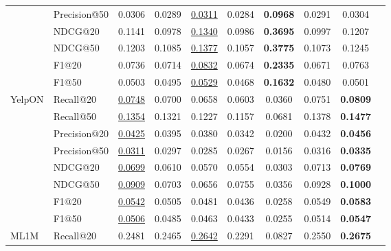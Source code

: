 \begin{table*}[]
{\begin{tabular}{@{}l|l|cccccc|cc@{}}
                        & Precision@50 & 0.0306       & 0.0289       & {\ul{0.0311}}    & 0.0284 & \textbf{0.0968} & 0.0291 & 0.0304          &  \\
                        & NDCG@20      & 0.1141       & 0.0978       & {\ul {0.1340}}    & 0.0986 & \textbf{0.3695} & 0.0997 & 0.1207          &  \\
                        & NDCG@50      & 0.1203       & 0.1085       & {\ul {0.1377}}    & 0.1057 & \textbf{0.3775} & 0.1073 & 0.1245          &  \\
                        & F1@20        & 0.0736       & 0.0714       & {\ul {0.0832}}    & 0.0674 & \textbf{0.2335} & 0.0671 & 0.0763          &  \\
                        & F1@50        & 0.0503       & 0.0495       & {\ul {0.0529}}    & 0.0468 & \textbf{0.1632} & 0.0480 & 0.0501          &  \\ \midrule
\multirow{8}{*}{YelpON} & Recall@20    & {\ul {0.0748}} & 0.0700       & 0.0658          & 0.0603 & 0.0360          & 0.0751 & \textbf{0.0809} &  \\
                        & Recall@50    & {\ul {0.1354}} & 0.1321       & 0.1227          & 0.1157 & 0.0681          & 0.1378 & \textbf{0.1477} &  \\
                        & Precision@20 & {\ul {0.0425}} & 0.0395       & 0.0380          & 0.0342 & 0.0200          & 0.0432 & \textbf{0.0456} &  \\
                        & Precision@50 & {\ul {0.0311}} & 0.0297       & 0.0285          & 0.0267 & 0.0156          & 0.0316 & \textbf{0.0335} &  \\
                        & NDCG@20      & {\ul {0.0699}} & 0.0610       & 0.0570          & 0.0554 & 0.0303          & 0.0713 & \textbf{0.0769} &  \\
                        & NDCG@50      & {\ul {0.0909}} & 0.0703       & 0.0656          & 0.0755 & 0.0356          & 0.0928 & \textbf{0.1000} &  \\
                        & F1@20        & {\ul {0.0542}} & 0.0505       & 0.0481          & 0.0436 & 0.0258          & 0.0549 & \textbf{0.0583} &  \\
                        & F1@50        & {\ul {0.0506}} & 0.0485       & 0.0463          & 0.0433 & 0.0255          & 0.0514 & \textbf{0.0547} &  \\ \midrule
\multirow{8}{*}{ML1M}   & Recall@20    & 0.2481       & 0.2465       & {\ul {0.2642}}    & 0.2291 & 0.0827          & 0.2550 & \textbf{0.2675} &  \\

\end{tabular}}
\end{table*}
